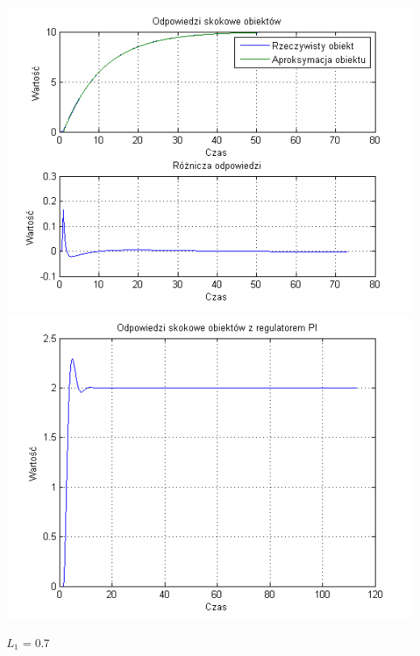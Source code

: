 \documentclass[10pt,a4paper]{article}
\begin{document}
\begin{center}
\includegraphics[scale=1]{images/jeden/skrypt_217.png}\\
\includegraphics[scale=1]{images/jeden/skrypt_218.png}\\
\end{center}
\newpage
$L_1$ = 0.7
\end{document}
